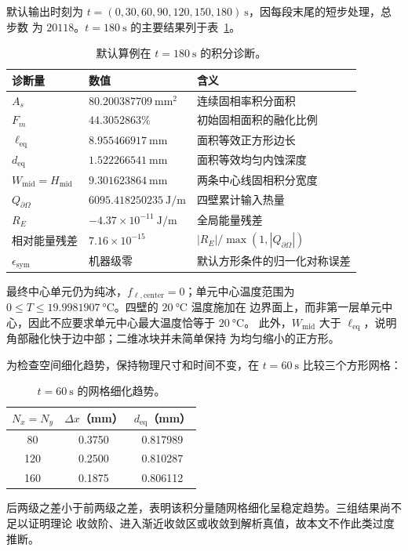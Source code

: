 \documentclass[UTF8,11pt]{ctexart}
\numberwithin{equation}{section}
\begin{document}
默认输出时刻为 $t=(0,30,60,90,120,150,180)\ \si{\second}$，因每段末尾的短步处理，总步数
为 $20118$。$t=\SI{180}{\second}$ 的主要结果列于表~\ref{tab:default-results}。

\begin{table}[H]
      \centering
      \caption{默认算例在 $t=\SI{180}{\second}$ 的积分诊断。}
      \label{tab:default-results}
      \begin{tabular}{lll}
            \toprule
            诊断量 & 数值 & 含义 \\
            \midrule
            $A_s$ & $\SI{80.200387709}{\milli\metre\squared}$ & 连续固相率积分面积 \\
            $F_m$ & $44.3052863\%$ & 初始固相面积的融化比例 \\
            $\ell_{\mathrm{eq}}$ & $\SI{8.955466917}{\milli\metre}$ & 面积等效正方形边长 \\
            $d_{\mathrm{eq}}$ & $\SI{1.522266541}{\milli\metre}$ & 面积等效均匀内蚀深度 \\
            $W_{\mathrm{mid}}=H_{\mathrm{mid}}$ & $\SI{9.301623864}{\milli\metre}$ & 两条中心线固相积分宽度 \\
            $Q_{\partial\Omega}$ & $\SI{6095.418250235}{\joule\per\metre}$ & 四壁累计输入热量 \\
            $R_E$ & $-4.37\times10^{-11}\ \si{\joule\per\metre}$ & 全局能量残差 \\
            相对能量残差 & $7.16\times10^{-15}$ & $|R_E|/\max(1,|Q_{\partial\Omega}|)$ \\
            $\epsilon_{\mathrm{sym}}$ & 机器级零 & 默认方形条件的归一化对称误差 \\
            \bottomrule
      \end{tabular}
\end{table}

最终中心单元仍为纯冰，$f_{\ell,\mathrm{center}}=0$；单元中心温度范围为
$0\le T\le\SI{19.9981907}{\degreeCelsius}$。四壁的 $\SI{20}{\degreeCelsius}$ 温度施加在
边界面上，而非第一层单元中心，因此不应要求单元中心最大温度恰等于 $\SI{20}{\degreeCelsius}$。
此外，$W_{\mathrm{mid}}$ 大于 $\ell_{\mathrm{eq}}$，说明角部融化快于边中部；二维冰块并未简单保持
为均匀缩小的正方形。

为检查空间细化趋势，保持物理尺寸和时间不变，在 $t=\SI{60}{\second}$ 比较三个方形网格：
\begin{table}[H]
      \centering
      \caption{$t=\SI{60}{\second}$ 的网格细化趋势。}
      \label{tab:grid-refinement}
      \begin{tabular}{ccc}
            \toprule
            $N_x=N_y$ & $\Delta x$（\si{\milli\metre}） & $d_{\mathrm{eq}}$（\si{\milli\metre}） \\
            \midrule
            80  & 0.3750 & 0.817989 \\
            120 & 0.2500 & 0.810287 \\
            160 & 0.1875 & 0.806112 \\
            \bottomrule
      \end{tabular}
\end{table}
后两级之差小于前两级之差，表明该积分量随网格细化呈稳定趋势。三组结果尚不足以证明理论
收敛阶、进入渐近收敛区或收敛到解析真值，故本文不作此类过度推断。
\end{document}
